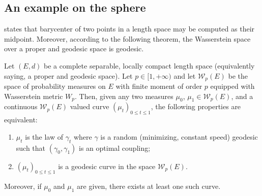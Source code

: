 \subsection{An example on the sphere}

 states that barycenter of two points in a length space
may be computed as their midpoint.
Moreover, according to the following theorem,
the Wasserstein space over a proper and geodesic space is geodesic.

\begin{thm}
	\label{thm:geodesic_Wasserstein_spaces}
	Let \( ( E , d ) \) be a complete separable, locally compact length space
	(equivalently saying, a proper and geodesic space).
	Let \( p \in [1, + \infty) \) and let \( \mathcal{W}_p(E) \) be the space of probability measures
	on \( E \) with finite moment of order \( p \)
	equipped with Wasserstein metric \( W _ { p } \).
	Then, given any two measures \( \mu _ { 0 }\), \( \mu _ { 1 } \in \mathcal{W}_p(E) \),
	and a continuous \( \mathcal{W}_p(E) \) valued curve \( \left( \mu _ { t } \right) _ { 0 \leq t \leq 1 } \),
	the following properties are equivalent:
	\begin{enumerate}
		\item \( \mu _ { t } \) is the law of \(\gamma _ { t } \) where \( \gamma \) is a random (minimizing, constant speed)
		      geodesic such that \( \left( \gamma _ { 0 } , \gamma _ { 1 } \right) \) is an optimal coupling;
		\item \( \left( \mu _ { t } \right) _ { 0 \leq t \leq 1 } \) is a geodesic curve in the space \( \mathcal{W}_p(E) \).
	\end{enumerate}
	Moreover, if \( \mu _ { 0 } \) and \( \mu _ { 1 } \) are given, there exists at least one such curve.
\end{thm}

